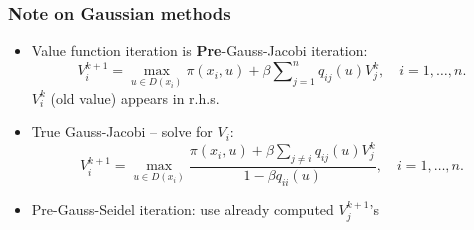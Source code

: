 \documentclass[bigger,handout]{beamer}
\newenvironment{stepitemize}{\begin{itemize}[<+->]}{\end{itemize} }
\begin{document}
\begin{frame}%

\frametitle{Note on Gaussian methods}

\begin{stepitemize}
\item Value function iteration is \textbf{Pre}-Gauss-Jacobi iteration:
\begin{equation*}
V_{i}^{k+1}=\max_{u\in D(x_{i})}\pi (x_{i},u)+\beta
\sum\nolimits_{j=1}^{n}q_{ij}(u)V_{j}^{k},\quad i=1,\ldots ,n.
\end{equation*}%
$V_{i}^{k}$ (old value) appears in r.h.s.

\item True Gauss-Jacobi -- solve for $V_{i}$:
\begin{equation*}
V_{i}^{k+1}=\max_{u\in D(x_{i})}\frac{\pi (x_{i},u)+\beta \sum_{j\neq
i}q_{ij}(u)V_{j}^{k}}{1-\beta q_{ii}(u)},\quad i=1,\ldots ,n.
\end{equation*}

\item Pre-Gauss-Seidel iteration: use already computed $V_{j}^{k+1}$'s
\end{stepitemize}



\end{frame}%
\end{document}
